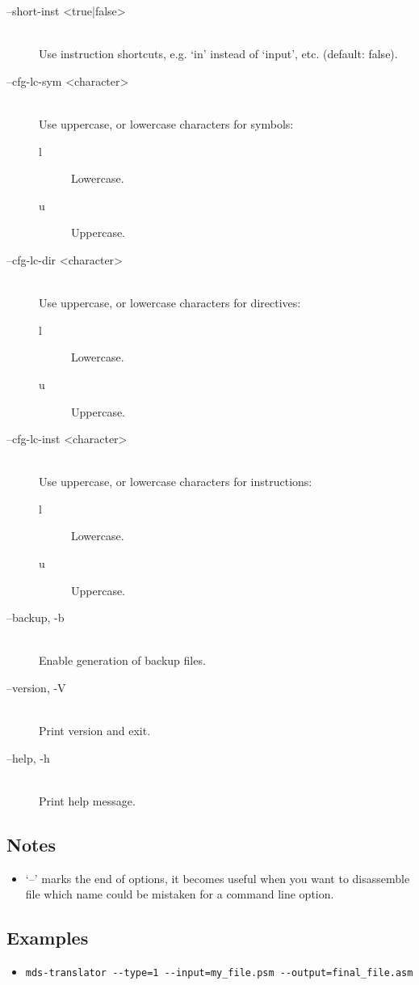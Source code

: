 \begin{description}
            \item[--short-inst <true|false>]~\\
                Use instruction shortcuts, e.g. `in' instead of `input', etc. (default: false).

            \item[--cfg-lc-sym <character>]~\\
                Use uppercase, or lowercase characters for symbols:
                \begin{description}
                    \item [l] Lowercase.
                    \item [u] Uppercase.
                \end{description}

            \item[--cfg-lc-dir <character>]~\\
                Use uppercase, or lowercase characters for directives:
                \begin{description}
                    \item [l] Lowercase.
                    \item [u] Uppercase.
                \end{description}

            \item[--cfg-lc-inst <character>]~\\
                Use uppercase, or lowercase characters for instructions:
                \begin{description}
                    \item [l] Lowercase.
                    \item [u] Uppercase.
                \end{description}

            \item[--backup, -b]~\\
                Enable generation of backup files.

            \item[--version, -V]~\\
                Print version and exit.

            \item[--help, -h]~\\
                Print help message.
        \end{description}

    \subsection{Notes}
        \begin{itemize}
            \item `--' marks the end of options, it becomes useful when you want to disassemble file which name could be mistaken for a command line option.
        \end{itemize}

    \subsection{Examples}
        \begin{itemize}
            \item \verb'mds-translator --type=1 --input=my_file.psm --output=final_file.asm'\\
        \end{itemize}
